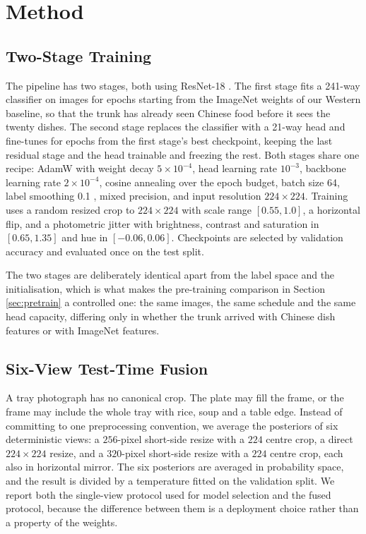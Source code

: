 \section{Method}
\label{sec:method}
\subsection{Two-Stage Training}
The pipeline has two stages, both using ResNet-18 \cite{he2016resnet}. The first
stage fits a 241-way classifier on \cnPreTrainN{} images for \cnPreEpochs{}
epochs starting from the ImageNet weights of our Western baseline, so that the
trunk has already seen Chinese food before it sees the twenty dishes. The second
stage replaces the classifier with a 21-way head and fine-tunes for
\cnEpochs{} epochs from the first stage's best checkpoint, keeping the last
residual stage and the head trainable and freezing the rest. Both stages share
one recipe: AdamW with weight decay $5\times10^{-4}$, head learning rate
$10^{-3}$, backbone learning rate $2\times10^{-4}$, cosine annealing over the
epoch budget, batch size 64, label smoothing 0.1
\cite{szegedy2016inception}, mixed precision, and input resolution
$224\times224$. Training uses a random resized crop to $224\times224$ with scale
range $[0.55,1.0]$, a horizontal flip, and a photometric jitter with brightness,
contrast and saturation in $[0.65,1.35]$ and hue in $[-0.06,0.06]$. Checkpoints
are selected by validation accuracy and evaluated once on the test split.

The two stages are deliberately identical apart from the label space and the
initialisation, which is what makes the pre-training comparison in
Section \ref{sec:pretrain} a controlled one: the same images, the same schedule
and the same head capacity, differing only in whether the trunk arrived with
Chinese dish features or with ImageNet features.

\subsection{Six-View Test-Time Fusion}
A tray photograph has no canonical crop. The plate may fill the frame, or the
frame may include the whole tray with rice, soup and a table edge. Instead of
committing to one preprocessing convention, we average the posteriors of six
deterministic views: a $256$-pixel short-side resize with a $224$ centre crop, a
direct $224\times224$ resize, and a $320$-pixel short-side resize with a $224$
centre crop, each also in horizontal mirror. The six posteriors are averaged in
probability space, and the result is divided by a temperature fitted on the
validation split. We report both the single-view protocol used for model
selection and the fused protocol, because the difference between them is a
deployment choice rather than a property of the weights.


